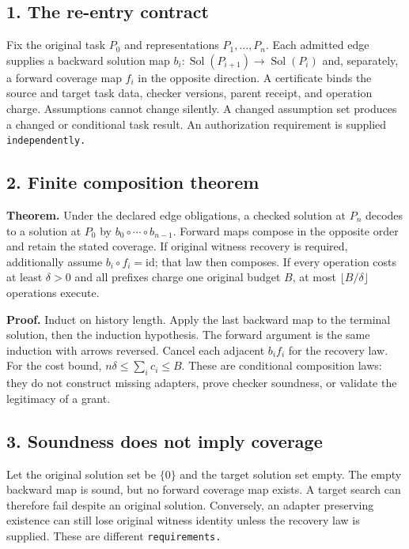 \documentclass[
  11pt,
]{article}
\begin{document}
\subsection{1. The re-entry contract}\label{the-re-entry-contract}

Fix the original task \(P_0\) and representations
\(P_1,\allowbreak \ldots,\allowbreak P_n\). Each admitted edge supplies
a backward solution map \(b_i:\operatorname{Sol}(P_{i+1})\to
\operatorname{Sol}(P_i)\) and, separately, a forward coverage map
\(f_i\) in the opposite direction. A certificate binds the source and
target task data, checker versions, parent receipt, and operation
charge. Assumptions cannot change silently. A changed assumption set
produces a changed or conditional task result. An authorization
requirement is supplied \nolinkurl{independently.}

\subsection{2. Finite composition
theorem}\label{finite-composition-theorem}

\textbf{Theorem.} Under the declared edge obligations, a checked
solution at \(P_n\) decodes to a solution at \(P_0\) by
\(b_0\circ\cdots\circ b_{n-1}\). Forward maps compose in the opposite
order and retain the stated coverage. If original witness recovery is
required, additionally assume \(b_i\circ f_i=\mathrm{id}\); that law
then composes. If every operation costs at least \(\delta>0\) and all
prefixes charge one original budget \(B\), at most
\(\lfloor B/\delta\rfloor\) operations execute.

\textbf{Proof.} Induct on history length. Apply the last backward map to
the terminal solution, then the induction hypothesis. The forward
argument is the same induction with arrows reversed. Cancel each
adjacent \(b_i f_i\) for the recovery law. For the cost bound,
\(n\delta\le\sum_i c_i\le B\). These are conditional composition laws:
they do not construct missing adapters, prove checker soundness, or
validate the legitimacy of a grant.

\subsection{3. Soundness does not imply
coverage}\label{soundness-does-not-imply-coverage}

Let the original solution set be \(\{0\}\) and the target solution set
empty. The empty backward map is sound, but no forward coverage map
exists. A target search can therefore fail despite an original solution.
Conversely, an adapter preserving existence can still lose original
witness identity unless the recovery law is supplied. These are
different \nolinkurl{requirements.}
\end{document}

